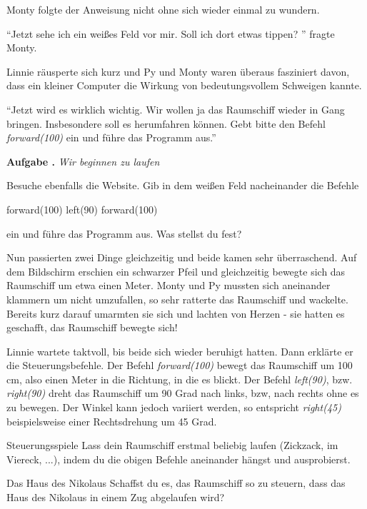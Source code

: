 \documentclass[a5paper,12pt,twoside,openright]{scrbook}
\newlength{\aufgabenskip}
\newcounter{aufgabennummer}
\newenvironment{aufgabeUnshaded}[1]{
  \refstepcounter{aufgabennummer}
  \textbf{Aufgabe \theaufgabennummer.} \emph{#1} \par
}{\vspace{\aufgabenskip}}
\begin{document}
Monty folgte der Anweisung nicht ohne sich wieder einmal zu wundern.

"`Jetzt sehe ich ein weißes Feld vor mir. Soll ich dort etwas tippen? "'
fragte Monty. 

Linnie räusperte sich kurz und Py und Monty waren überaus fasziniert davon, dass ein kleiner Computer 
die Wirkung von bedeutungsvollem Schweigen kannte.

"`Jetzt wird es wirklich wichtig. Wir wollen ja das Raumschiff wieder in Gang bringen. 
Insbesondere soll es herumfahren können. Gebt bitte den Befehl \emph{forward(100)} ein und führe das Programm aus."'

\begin{aufgabeUnshaded}{Wir beginnen zu laufen}
 Besuche ebenfalls die Website.
 Gib in dem weißen Feld nacheinander die Befehle
 \begin{pythoncode}
  forward(100)
  left(90)
  forward(100)
 \end{pythoncode}
 ein und führe das Programm aus.
 Was stellst du fest?
\end{aufgabeUnshaded}

Nun passierten zwei Dinge gleichzeitig und beide kamen sehr überraschend.
Auf dem Bildschirm erschien ein schwarzer Pfeil und gleichzeitig bewegte sich das Raumschiff um etwa einen Meter.
Monty und Py mussten sich aneinander klammern um nicht umzufallen, so sehr ratterte das Raumschiff und wackelte.
Bereits kurz darauf umarmten sie sich und lachten von Herzen - 
sie hatten es geschafft, das Raumschiff bewegte sich!

Linnie wartete taktvoll, bis beide sich wieder beruhigt hatten. 
Dann erklärte er die Steuerungsbefehle.
Der Befehl \emph{forward(100)} bewegt das Raumschiff um 100 cm, also einen Meter 
in die Richtung, in die es blickt.
Der Befehl \emph{left(90)}, bzw. \emph{right(90)} dreht das Raumschiff um 90 Grad nach links, bzw, nach rechts ohne es zu bewegen.
Der Winkel kann jedoch variiert werden, so entspricht \emph{right(45)} beispielsweise einer Rechtsdrehung um 45 Grad.

\begin{aufgabe}{Steuerungsspiele}
 Lass dein Raumschiff erstmal beliebig laufen (Zickzack, im Viereck, ...), indem du die obigen Befehle aneinander hängst 
 und ausprobierst.
\end{aufgabe}

\begin{aufgabe}{Das Haus des Nikolaus}
 Schaffst du es, das Raumschiff so zu steuern, dass das Haus des Nikolaus in einem Zug 
 abgelaufen wird? 
\end{aufgabe}
\end{document}
